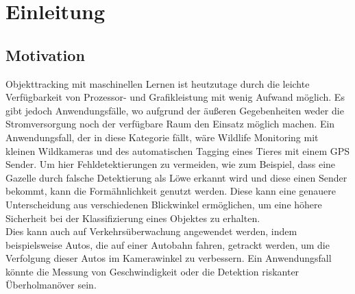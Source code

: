 \chapter{Einleitung}
\label{ch:intro}


\section{Motivation}{ 

	Objekttracking mit maschinellen Lernen ist heutzutage durch die leichte Verfügbarkeit von Prozessor- und Grafikleistung mit wenig Aufwand möglich. Es gibt jedoch Anwendungsfälle, wo aufgrund der äußeren Gegebenheiten weder die Stromversorgung noch der verfügbare Raum den Einsatz möglich machen. Ein Anwendungsfall, der in diese Kategorie fällt, wäre Wildlife Monitoring mit kleinen Wildkameras und des automatischen Tagging eines Tieres mit einem GPS Sender. Um hier Fehldetektierungen zu vermeiden, wie zum Beispiel, dass eine Gazelle durch falsche Detektierung als Löwe erkannt wird und diese einen Sender bekommt, kann die Formähnlichkeit genutzt werden. Diese kann eine genauere Unterscheidung aus verschiedenen Blickwinkel ermöglichen, um eine höhere Sicherheit bei der Klassifizierung eines Objektes zu erhalten. \\
	Dies kann auch auf Verkehrsüberwachung angewendet werden, indem beispielsweise Autos, die auf einer Autobahn fahren, getrackt werden, um die Verfolgung dieser Autos im Kamerawinkel zu verbessern. Ein Anwendungsfall könnte die Messung von Geschwindigkeit oder die Detektion riskanter Überholmanöver sein.
}

